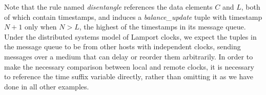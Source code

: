 Note that the rule named \emph{disentangle} references the data elements $C$ and $L$, both of which
contain timestamps, and induces a \emph{balance\_update} tuple with timestamp $N+1$ only when $N > L$,
the highest of the timestamps in its message queue.  Under the distributed systems model of Lamport clocks, 
we expect the tuples in the message queue to  be from other hosts with independent clocks, sending messages 
over a medium that can delay or reorder them arbitrarily.  In order to make the necessary comparison between local
and remote clocks, it is necessary to reference the time suffix variable directly, rather than omitting it as we have done 
in all other \lang examples.




